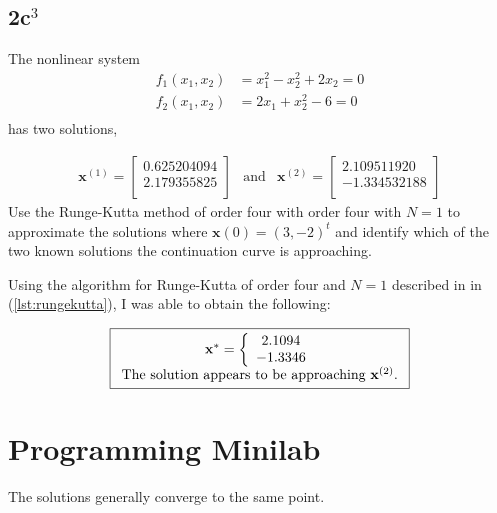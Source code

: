 \documentclass[12pt]{article}
\begin{document}
\subsection{2c$^3$}
The nonlinear system
\begin{align*}
  f_1(x_1,x_2)&=x_1^2-x_2^2+2x_2 =0 \\
  f_2(x_1,x_2)&=2x_1+x_2^2-6 =0 \\
\end{align*}
has two solutions,

\begin{equation*}
  \begin{array}{ccc}
    \mathbf{x}^{(1)}=
    \begin{bmatrix}
      0.625204094 \\
      2.179355825 \\
    \end{bmatrix}
    &
    \mathrm{and}
    &
    \mathbf{x}^{(2)}=
    \begin{bmatrix}
      2.109511920 \\
      -1.334532188 \\
    \end{bmatrix}
  \end{array}
\end{equation*}
Use the Runge-Kutta method of order four with order four with $N=1$ to
approximate the solutions where $\mathbf{x}(0)=(3,-2)^t$ and identify
which of the two known solutions the continuation curve is
approaching.

Using the algorithm for Runge-Kutta of order four and $N=1$ described in
in~\texttt{} (\cref{lst:rungekutta}), I was able to obtain the following:

\begin{equation*}
  \boxed{
    \begin{array}[h]{cc}
    \mathbf{x}^*= \left\{
      \begin{array}{c}
        2.1094 \\
        -1.3346 \\
      \end{array}
    \right.\\
    \text{The solution appears to be approaching }\mathbf{x}^{(2)}\text{.}
  \end{array}
  }
\end{equation*}
\begin{minipage}[h]{1.0\linewidth}
  
\end{minipage}

\section{Programming Minilab}
The solutions generally converge to the same point.
\end{document}
